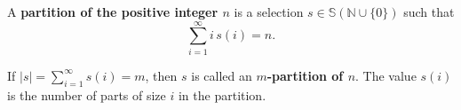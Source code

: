 A \textbf{partition of the positive integer $n$} is a selection $s \in \mathbb{S}(\mathbb{N} \cup \{0\})$ such that
$$\sum_{i=1}^{\infty} i\,s(i) = n.$$

If $|s| = \sum_{i=1}^{\infty} s(i) = m$, then $s$ is called an \textbf{$m$-partition of $n$}. The value $s(i)$ is the number of parts of size $i$ in the partition.

